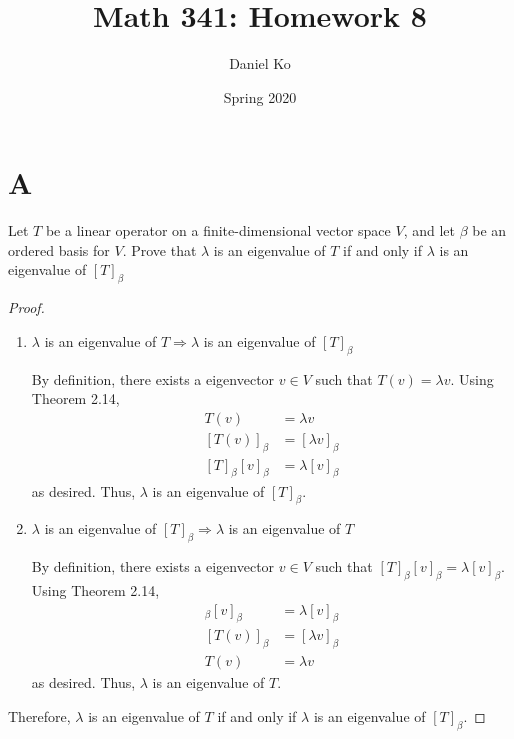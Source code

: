 \documentclass[11pt]{scrartcl}
\title{Math 341: Homework 8}
\author{Daniel Ko}
\date{Spring 2020}
\begin{document}
\maketitle

\section{A}
Let $T$ be a linear operator on a finite-dimensional vector space $V$, and let $\beta$ be an ordered basis for $V$.
Prove that $\lambda$ is an eigenvalue of $T$ if and only if $\lambda$ is an eigenvalue of $[T]_\beta$
\begin{proof}\
	\begin{enumerate}[label=\alph*.]
		\item{
		      $\lambda$ is an eigenvalue of $T \Rightarrow \lambda$ is an eigenvalue of $[T]_\beta$\par
		      By definition, there exists a eigenvector $v \in V$ such that $T(v) = \lambda v$.
		      Using Theorem 2.14,
		      \begin{align*}
			      T(v)                & = \lambda v         \\
			      [T(v)]_\beta        & = [\lambda v]_\beta \\
			      [T]_\beta [v]_\beta & = \lambda [v]_\beta
		      \end{align*}
		      as desired.
		      Thus, $\lambda$ is an eigenvalue of $[T]_\beta$.
		      }
		\item{
		      $\lambda$ is an eigenvalue of $[T]_\beta \Rightarrow \lambda$ is an eigenvalue of $T$ \par
		      By definition, there exists a eigenvector $v \in V$ such that $[T]_\beta [v]_\beta = \lambda [v]_\beta$.
		      Using Theorem 2.14,
		      \begin{align*}
			      [T]_\beta [v]_\beta & = \lambda [v]_\beta \\
			      [T(v)]_\beta        & = [\lambda v]_\beta \\
			      T(v)                & = \lambda v
		      \end{align*}
		      as desired.
		      Thus, $\lambda$ is an eigenvalue of $T$.
		      }
	\end{enumerate}
	Therefore, $\lambda$ is an eigenvalue of $T$ if and only if $\lambda$ is an eigenvalue of $[T]_\beta$.
\end{proof}

\end{document}
